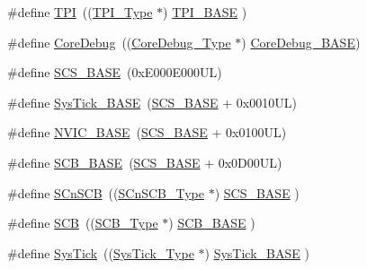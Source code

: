 \begin{DoxyCompactItemize}
\item 
\#define \mbox{\hyperlink{group___c_m_s_i_s__core__base_ga8b4dd00016aed25a0ea54e9a9acd1239}{T\+PI}}~((\mbox{\hyperlink{struct_t_p_i___type}{T\+P\+I\+\_\+\+Type}}       $\ast$)     \mbox{\hyperlink{group___c_m_s_i_s__core__base_ga2b1eeff850a7e418844ca847145a1a68}{T\+P\+I\+\_\+\+B\+A\+SE}}      )
\item 
\#define \mbox{\hyperlink{group___c_m_s_i_s__core__base_gab6e30a2b802d9021619dbb0be7f5d63d}{Core\+Debug}}~((\mbox{\hyperlink{struct_core_debug___type}{Core\+Debug\+\_\+\+Type}} $\ast$)     \mbox{\hyperlink{group___c_m_s_i_s__core__base_ga680604dbcda9e9b31a1639fcffe5230b}{Core\+Debug\+\_\+\+B\+A\+SE}})
\item 
\#define \mbox{\hyperlink{group___c_m_s_i_s__core__base_ga3c14ed93192c8d9143322bbf77ebf770}{S\+C\+S\+\_\+\+B\+A\+SE}}~(0x\+E000\+E000\+U\+L)
\item 
\#define \mbox{\hyperlink{group___c_m_s_i_s__core__base_ga58effaac0b93006b756d33209e814646}{Sys\+Tick\+\_\+\+B\+A\+SE}}~(\mbox{\hyperlink{group___c_m_s_i_s__core__base_ga3c14ed93192c8d9143322bbf77ebf770}{S\+C\+S\+\_\+\+B\+A\+SE}} +  0x0010\+U\+L)
\item 
\#define \mbox{\hyperlink{group___c_m_s_i_s__core__base_gaa0288691785a5f868238e0468b39523d}{N\+V\+I\+C\+\_\+\+B\+A\+SE}}~(\mbox{\hyperlink{group___c_m_s_i_s__core__base_ga3c14ed93192c8d9143322bbf77ebf770}{S\+C\+S\+\_\+\+B\+A\+SE}} +  0x0100\+U\+L)
\item 
\#define \mbox{\hyperlink{group___c_m_s_i_s__core__base_gad55a7ddb8d4b2398b0c1cfec76c0d9fd}{S\+C\+B\+\_\+\+B\+A\+SE}}~(\mbox{\hyperlink{group___c_m_s_i_s__core__base_ga3c14ed93192c8d9143322bbf77ebf770}{S\+C\+S\+\_\+\+B\+A\+SE}} +  0x0\+D00\+U\+L)
\item 
\#define \mbox{\hyperlink{group___c_m_s_i_s__core__base_ga9fe0cd2eef83a8adad94490d9ecca63f}{S\+Cn\+S\+CB}}~((\mbox{\hyperlink{struct_s_cn_s_c_b___type}{S\+Cn\+S\+C\+B\+\_\+\+Type}}    $\ast$)     \mbox{\hyperlink{group___c_m_s_i_s__core__base_ga3c14ed93192c8d9143322bbf77ebf770}{S\+C\+S\+\_\+\+B\+A\+SE}}      )
\item 
\#define \mbox{\hyperlink{group___c_m_s_i_s__core__base_gaaaf6477c2bde2f00f99e3c2fd1060b01}{S\+CB}}~((\mbox{\hyperlink{struct_s_c_b___type}{S\+C\+B\+\_\+\+Type}}       $\ast$)     \mbox{\hyperlink{group___c_m_s_i_s__core__base_gad55a7ddb8d4b2398b0c1cfec76c0d9fd}{S\+C\+B\+\_\+\+B\+A\+SE}}      )
\item 
\#define \mbox{\hyperlink{group___c_m_s_i_s__core__base_gacd96c53beeaff8f603fcda425eb295de}{Sys\+Tick}}~((\mbox{\hyperlink{struct_sys_tick___type}{Sys\+Tick\+\_\+\+Type}}   $\ast$)     \mbox{\hyperlink{group___c_m_s_i_s__core__base_ga58effaac0b93006b756d33209e814646}{Sys\+Tick\+\_\+\+B\+A\+SE}}  )

\end{DoxyCompactItemize}
